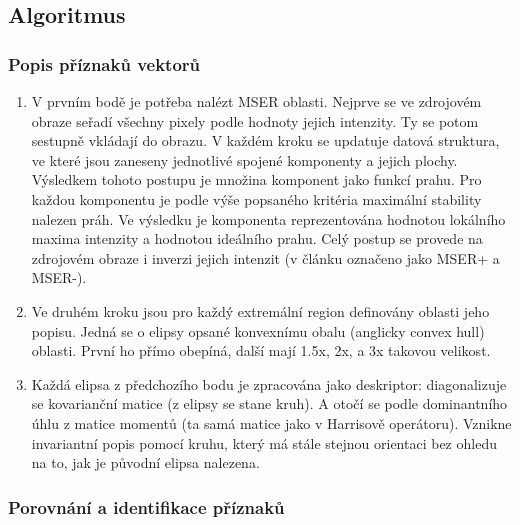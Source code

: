 	\subsection{Algoritmus}
	
	\subsubsection{Popis příznaků vektorů}
		
	\begin{enumerate}
		\item V prvním bodě je potřeba nalézt MSER oblasti. Nejprve se ve zdrojovém obraze seřadí všechny pixely podle hodnoty jejich intenzity. Ty se potom sestupně vkládají do obrazu. V každém kroku se updatuje datová struktura, ve které jsou zaneseny jednotlivé spojené komponenty a jejich plochy. Výsledkem tohoto postupu je množina komponent jako funkcí prahu. Pro každou komponentu je podle výše popsaného kritéria maximální stability nalezen práh. Ve výsledku je komponenta reprezentována hodnotou lokálního maxima intenzity a hodnotou ideálního prahu. Celý postup se provede na zdrojovém obraze i inverzi jejich intenzit (v článku označeno jako MSER+ a MSER-).
		
		\item Ve druhém kroku jsou pro každý extremální	region definovány oblasti jeho popisu. Jedná se o elipsy opsané konvexnímu obalu (anglicky convex hull) oblasti. První ho přímo obepíná, další mají 1.5x, 2x, a 3x takovou velikost.
		
		\item Každá elipsa z předchozího bodu je zpracována jako deskriptor: diagonalizuje se kovarianční matice (z elipsy se stane kruh). A otočí se podle dominantního úhlu z matice momentů (ta samá matice jako v Harrisově operátoru). Vznikne invariantní popis pomocí kruhu, který má stále stejnou orientaci bez ohledu na to, jak je původní elipsa nalezena.	
	\end{enumerate}
	
	\subsubsection{Porovnání a identifikace příznaků}
	
